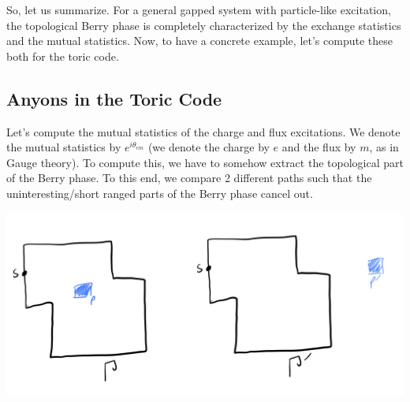 So, let us summarize. For a general gapped system with particle-like excitation, the topological Berry phase is completely characterized by the exchange statistics and the mutual statistics. Now, to have a concrete example, let's compute these both for the toric code.

\subsection{Anyons in the Toric Code}
Let's compute the mutual statistics of the charge and flux excitations. We denote the mutual statistics by $e^{i\theta_{em}}$ (we denote the charge by $e$ and the flux by $m$, as in Gauge theory). To compute this, we have to somehow extract the topological part of the Berry phase. To this end, we compare 2 different paths such that the uninteresting/short ranged parts of the Berry phase cancel out.
\begin{center}
    \includegraphics[scale=0.35]{Lectures/Images/lec5-toricpaths.png}
\end{center}


